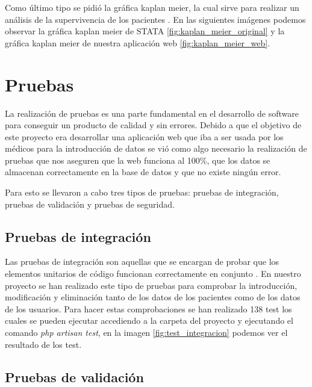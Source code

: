 Como último tipo se pidió la gráfica kaplan meier, la cual sirve para realizar un análisis de la supervivencia de los pacientes \cite{kaplan}. En las siguientes imágenes podemos observar la gráfica kaplan meier de STATA \ref{fig:kaplan_meier_original} y la gráfica kaplan meier de nuestra aplicación web \ref{fig:kaplan_meier_web}.


\section{Pruebas}

La realización de pruebas es una parte fundamental en el desarrollo de software para conseguir un producto de calidad y sin errores. Debido a que el objetivo de este proyecto era desarrollar una aplicación web que iba a ser usada por los médicos para la introducción de datos se vió como algo necesario la realización de pruebas que nos aseguren que la web funciona al 100\%, que los datos se almacenan correctamente en la base de datos y que no existe ningún error.

Para esto se llevaron a cabo tres tipos de pruebas: pruebas de integración, pruebas de validación y pruebas de seguridad.

\subsection{Pruebas de integración}

Las pruebas de integración son aquellas que se encargan de probar que los elementos unitarios de código funcionan correctamente en conjunto \cite{pruebasIntegracion}. En nuestro proyecto se han realizado este tipo de pruebas para comprobar la introducción, modificación y eliminación tanto de los datos de los pacientes como de los datos de los usuarios. Para hacer estas comprobaciones se han realizado 138 test los cuales se pueden ejecutar accediendo a la carpeta del proyecto y ejecutando el comando \textit{php artisan test}, en la imagen \ref{fig:test_integracion} podemos ver el resultado de los test. 


\subsection{Pruebas de validación}

